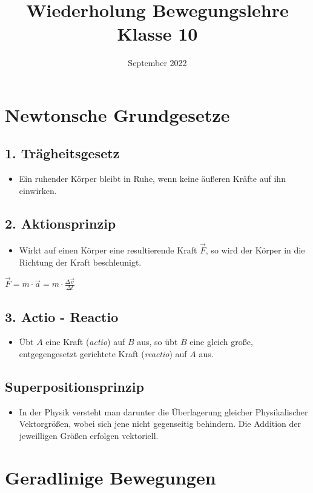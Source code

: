 \documentclass{article}
\title{Wiederholung Bewegungslehre Klasse 10}
\author{September 2022}
\date{}
\begin{document}
\maketitle
\section*{Newtonsche Grundgesetze}
\subsection*{1. Trägheitsgesetz}
\begin{itemize}
	\item Ein ruhender Körper bleibt in Ruhe, wenn keine äußeren Kräfte auf ihn einwirken.
\end{itemize}
\subsection*{2. Aktionsprinzip}
\begin{itemize}
	\item Wirkt auf einen Körper eine resultierende Kraft $\vec{F}$, so wird der Körper in die Richtung der Kraft beschleunigt.
\end{itemize}
\begin{center}
	$\vec{F} = m \cdot \vec{a} = m \cdot \frac{\Delta \vec{v}}{\Delta t}$
\end{center}
\subsection*{3. Actio - Reactio}
\begin{itemize}
	\item Übt $A$ eine Kraft (\textit{actio}) auf $B$ aus, so übt $B$ eine gleich große, entgegengesetzt gerichtete Kraft (\textit{reactio}) auf $A$ aus.
\end{itemize}
\subsection*{Superpositionsprinzip}
\begin{itemize}
	\item In der Physik versteht man darunter die Überlagerung gleicher Physikalischer Vektorgrößen, wobei sich jene nicht gegenseitig behindern. Die Addition der jeweilligen Größen erfolgen vektoriell.
\end{itemize}
\section*{Geradlinige Bewegungen}
\end{document}

